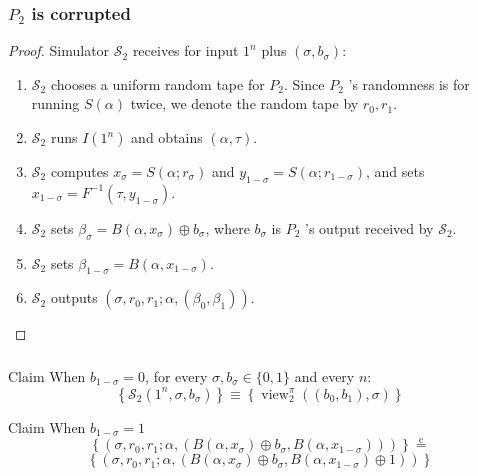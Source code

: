 \documentclass{beamer}
\begin{document}
    \begin{frame}
        \frametitle{$P_{2}$ is corrupted}
    
        \begin{proof}
            Simulator $\mathcal{S}_{2}$ receives for input $1^{n}$ plus $\left(\sigma, b_{\sigma}\right)$:
            \begin{enumerate}
                \item $\mathcal{S}_{2}$ chooses a uniform random tape for $P_{2}$. Since $P_{2}$ 's randomness is for running $S(\alpha)$ twice, we denote the random tape by $r_{0}, r_{1} .$
                \item $\mathcal{S}_{2}$ runs $I\left(1^{n}\right)$ and obtains $(\alpha, \tau)$.
                \item $\mathcal{S}_{2}$ computes $x_{\sigma}=S\left(\alpha ; r_{\sigma}\right)$ and $y_{1-\sigma}=S\left(\alpha ; r_{1-\sigma}\right)$, and sets $x_{1-\sigma}=F^{-1}\left(\tau, y_{1-\sigma}\right)$.
                \item $\mathcal{S}_{2}$ sets $\beta_{\sigma}=B\left(\alpha, x_{\sigma}\right) \oplus b_{\sigma}$, where $b_{\sigma}$ is $P_{2}$ 's output received by $\mathcal{S}_{2}$.
                \item $\mathcal{S}_{2}$ sets $\beta_{1-\sigma}=B\left(\alpha, x_{1-\sigma}\right)$.
                \item $\mathcal{S}_{2}$ outputs $\left(\sigma, r_{0}, r_{1} ; \alpha,\left(\beta_{0}, \beta_{1}\right)\right)$.
            \end{enumerate}
        \end{proof}
    
    \end{frame}

    \begin{frame}
        \frametitle{}
    
        \begin{block}{Claim}
            When $b_{1-\sigma}=0$, for every $\sigma, b_{\sigma} \in\{0,1\}$ and every $n$:
            $$
            \left\{\mathcal{S}_{2}\left(1^{n}, \sigma, b_{\sigma}\right)\right\} \equiv\left\{\operatorname{view}_{2}^{\pi}\left(\left(b_{0}, b_{1}\right), \sigma\right)\right\}
            $$
        \end{block}

        \begin{block}{Claim}
            When $b_{1-\sigma}=1$
            $$
            \left\{\left(\sigma, r_{0}, r_{1} ; \alpha,\left(B\left(\alpha, x_{\sigma}\right) \oplus b_{\sigma}, B\left(\alpha, x_{1-\sigma}\right)\right)\right)\right\} \stackrel{\mathrm{c}}{=}
            $$
            $$
            \left\{\left(\sigma, r_{0}, r_{1} ; \alpha,\left(B\left(\alpha, x_{\sigma}\right) \oplus b_{\sigma}, B\left(\alpha, x_{1-\sigma}\right) \oplus 1\right)\right)\right\}
            $$
        \end{block}
    
    \end{frame}
    
\end{document}
